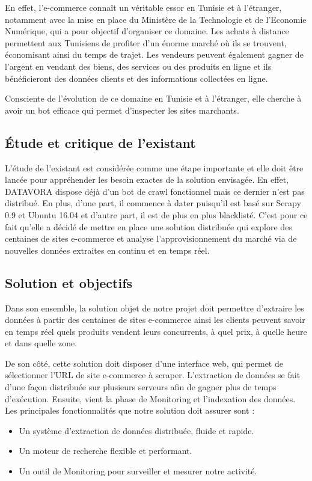 En effet, l'e-commerce connaît un véritable essor en Tunisie et à l'étranger, notamment avec la mise en place du Ministère de la Technologie et de l'Economie Numérique, qui a pour objectif d'organiser ce domaine. Les achats à distance permettent aux Tunisiens de profiter d'un énorme marché où ils se trouvent, économisant ainsi du temps de trajet. Les vendeurs peuvent également gagner de l'argent en vendant des biens, des services ou des produits en ligne et ils bénéficieront des données clients et des informations collectées en ligne.

Consciente de l’évolution de ce domaine en Tunisie et à l'étranger, elle cherche à avoir un bot efficace qui permet d'inspecter les sites marchants.

\subsection{Étude et critique de l’existant}
L'étude de l'existant est considérée comme une étape importante et elle doit être lancée pour appréhender les besoin exactes de la solution envisagée.
En effet, DATAVORA dispose déjà d’un bot de crawl fonctionnel mais ce dernier n'est pas distribué. En plus, d'une part, il commence à dater puisqu'il est basé sur Scrapy 0.9 et Ubuntu 16.04 et d'autre part, il est de plus en plus blacklisté. C'est pour ce fait qu'elle  a décidé de mettre en place une solution distribuée qui explore des centaines de sites e-commerce et analyse l'approvisionnement du marché via de nouvelles données extraites en continu et en temps réel.

\subsection{Solution et objectifs }
Dans son ensemble, la solution objet de notre projet doit permettre d'extraire les données à partir des centaines de sites e-commerce ainsi les clients peuvent savoir en temps réel quels produits vendent leurs concurrents, à quel prix, à quelle heure et dans quelle zone.

De son côté, cette solution doit disposer d’une interface web, qui permet de sélectionner l'URL de site e-commerce à scraper.
L'extraction de données se fait d'une façon distribuée sur plusieurs serveurs afin de gagner plus de temps d'exécution.  Ensuite, vient la phase de Monitoring et l'indexation des données.
\\
Les principales fonctionnalités que notre solution doit assurer sont :
\begin{itemize}[font=\normalsize]
\item Un système d'extraction de données distribuée, fluide et rapide.
\item Un moteur de recherche flexible et performant.
\item Un outil de Monitoring pour surveiller et mesurer notre activité.
\end{itemize}

